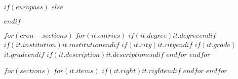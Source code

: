 \documentclass{europasscv}
\begin{document}
$if(europass)$
\ecvpersonalinfo
$else$
\maketitle
$endif$

$for(cron-sections)$
  $for(it.entries)$
    {$if(it.degree)$$it.degree$$endif$}
    {$if(it.institution)$$it.institution$$endif$}
    {$if(it.city)$$it.city$$endif$}
    {$if(it.grade)$$it.grade$$endif$}
    {$if(it.description)$$it.description$$endif$}
  $endfor$
$endfor$

$for(sections)$
  $for(it.items)$
    {$if(it.right)$$it.right$$endif$}
  $endfor$
$endfor$
\end{document}
